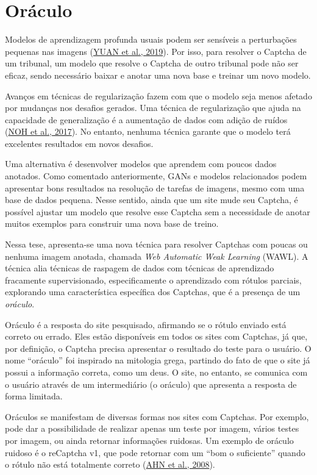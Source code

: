 \documentclass[12pt,twoside,brazilian]{book}
\begin{document}
\hypertarget{sec-intro-oraculo}{%
\section{Oráculo}\label{sec-intro-oraculo}}

Modelos de aprendizagem profunda usuais podem ser sensíveis a
perturbações pequenas nas imagens (\protect\hyperlink{ref-yuan2019}{YUAN
et al., 2019}). Por isso, para resolver o Captcha de um tribunal, um
modelo que resolve o Captcha de outro tribunal pode não ser eficaz,
sendo necessário baixar e anotar uma nova base e treinar um novo modelo.

Avanços em técnicas de regularização fazem com que o modelo seja menos
afetado por mudanças nos desafios gerados. Uma técnica de regularização
que ajuda na capacidade de generalização é a aumentação de dados com
adição de ruídos (\protect\hyperlink{ref-noh2017}{NOH et al., 2017}). No
entanto, nenhuma técnica garante que o modelo terá excelentes resultados
em novos desafios.

Uma alternativa é desenvolver modelos que aprendem com poucos dados
anotados. Como comentado anteriormente, GANs e modelos relacionados
podem apresentar bons resultados na resolução de tarefas de imagens,
mesmo com uma base de dados pequena. Nesse sentido, ainda que um site
mude seu Captcha, é possível ajustar um modelo que resolve esse Captcha
sem a necessidade de anotar muitos exemplos para construir uma nova base
de treino.

Nessa tese, apresenta-se uma nova técnica para resolver Captchas com
poucas ou nenhuma imagem anotada, chamada \emph{Web Automatic Weak
Learning} (WAWL). A técnica alia técnicas de raspagem de dados com
técnicas de aprendizado fracamente supervisionado, especificamente o
aprendizado com rótulos parciais, explorando uma característica
específica dos Captchas, que é a presença de um \emph{oráculo}.

Oráculo é a resposta do site pesquisado, afirmando se o rótulo enviado
está correto ou errado. Eles estão disponíveis em todos os sites com
Captchas, já que, por definição, o Captcha precisa apresentar o
resultado do teste para o usuário. O nome ``oráculo'' foi inspirado na
mitologia grega, partindo do fato de que o site já possui a informação
correta, como um deus. O site, no entanto, se comunica com o usuário
através de um intermediário (o oráculo) que apresenta a resposta de
forma limitada.

Oráculos se manifestam de diversas formas nos sites com Captchas. Por
exemplo, pode dar a possibilidade de realizar apenas um teste por
imagem, vários testes por imagem, ou ainda retornar informações
ruidosas. Um exemplo de oráculo ruidoso é o reCaptcha v1, que pode
retornar com um ``bom o suficiente'' quando o rótulo não está totalmente
correto
(\protect\hyperlink{ref-vonahnReCAPTCHAHumanBasedCharacter2008}{AHN et
al., 2008}).
\end{document}

